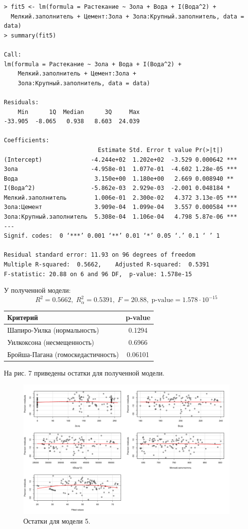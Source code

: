 \documentclass[10pt]{article}
\begin{document}
\begin{verbatim}
> fit5 <- lm(formula = Растекание ~ Зола + Вода + I(Вода^2) +
  Мелкий.заполнитель + Цемент:Зола + Зола:Крупный.заполнитель, data = data)
> summary(fit5)

Call:
lm(formula = Растекание ~ Зола + Вода + I(Вода^2) + 
    Мелкий.заполнитель + Цемент:Зола + 
    Зола:Крупный.заполнитель, data = data)

Residuals:
    Min      1Q  Median      3Q     Max 
-33.905  -8.065   0.938   8.603  24.039 

Coefficients:
                           Estimate Std. Error t value Pr(>|t|)    
(Intercept)              -4.244e+02  1.202e+02  -3.529 0.000642 ***
Зола                     -4.958e-01  1.077e-01  -4.602 1.28e-05 ***
Вода                      3.150e+00  1.180e+00   2.669 0.008940 ** 
I(Вода^2)                -5.862e-03  2.929e-03  -2.001 0.048184 *  
Мелкий.заполнитель        1.006e-01  2.300e-02   4.372 3.13e-05 ***
Зола:Цемент               3.909e-04  1.099e-04   3.557 0.000584 ***
Зола:Крупный.заполнитель  5.308e-04  1.106e-04   4.798 5.87e-06 ***
---
Signif. codes:  0 ‘***’ 0.001 ‘**’ 0.01 ‘*’ 0.05 ‘.’ 0.1 ‘ ’ 1

Residual standard error: 11.93 on 96 degrees of freedom
Multiple R-squared:  0.5662,	Adjusted R-squared:  0.5391 
F-statistic: 20.88 on 6 and 96 DF,  p-value: 1.578e-15
\end{verbatim}

У полученной модели:
$$
  R^2 = 0.5662, \; R^2_{\alpha} = 0.5391, \; F = 20.88, \; \text{p-value} = 1.578 \cdot 10^{-15}
$$

\begin{tabularx}{\textwidth}{ |X|c| }
  \hline
  Критерий & p-value \\
  \hline
  Шапиро-Уилка (нормальность) & 0.1294 \\
  \hline
  Уилкоксона (несмещенность) & 0.6966 \\
  \hline
  Бройша-Пагана (гомоскедастичность) & 0.06101 \\
  \hline
\end{tabularx}

\bigskip

На рис. 7 приведены остатки для полученной модели.

\begin{figure}[h]
  \centering
  \includegraphics[scale=0.4]{resplots_5.png}
  \caption{Остатки для модели 5.}
\end{figure}
\end{document}
